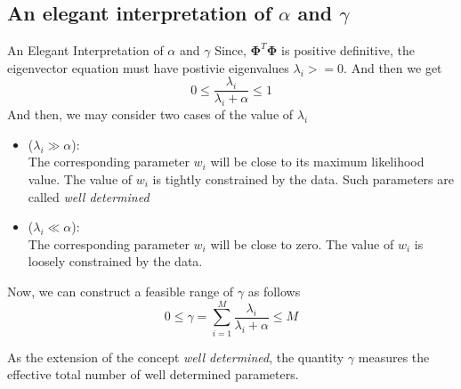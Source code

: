 \documentclass{bredelebeamer}
\begin{document}
\subsection{An elegant interpretation of $\alpha$ and $\gamma$}
\begin{frame}{An Elegant Interpretation of $\alpha$ and $\gamma$}
  Since, $\boldsymbol{\Phi}^T\boldsymbol{\Phi}$ is positive definitive, the eigenvector
  equation must have postivie eigenvalues $\lambda_i >= 0$. And then we get
  \begin{equation}
    0 \leq \frac{\lambda_i}{\lambda_i + \alpha} \leq 1
  \end{equation}
  And then, we may consider two cases of the value of $\lambda_i$

  \begin{itemize}
    \item ($\lambda_i \gg \alpha$): \\
          The corresponding parameter $w_i$ will be close to its maximum
          likelihood value. The value of $w_i$ is tightly constrained
          by the data. Such parameters are called \textit{well determined}

    \item ($\lambda_i \ll \alpha$): \\
          The corresponding parameter $w_i$ will be close to zero. The value
          of $w_i$ is loosely constrained by the data.
  \end{itemize}

  Now, we can construct a feasible range of $\gamma$ as follows
  \begin{equation}
    0 \leq \gamma = \sum_{i=1}^M \frac{\lambda_i}{\lambda_i + \alpha} \leq M
  \end{equation}

  As the extension of the concept \textit{well determined}, the quantity $\gamma$
  measures the effective total number of well determined parameters.

\end{frame}
\end{document}
